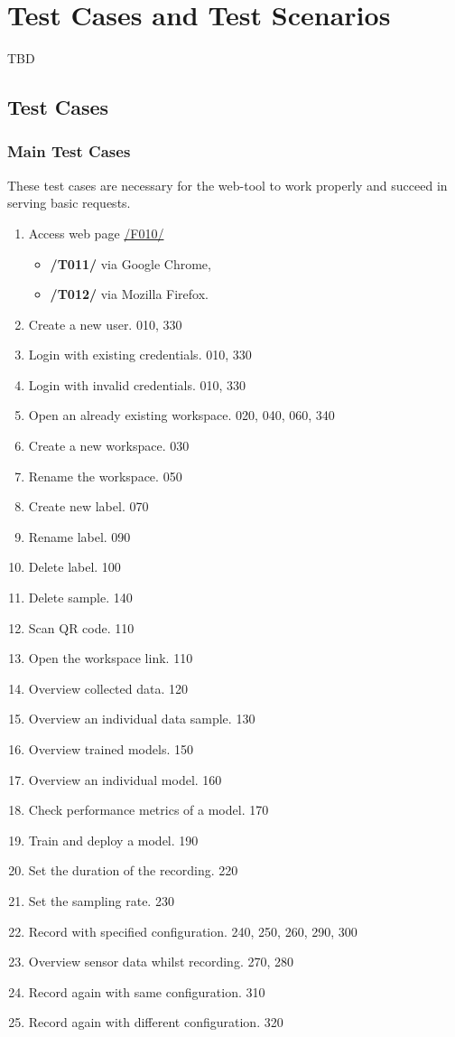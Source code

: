 \section{Test Cases and Test Scenarios}
TBD
\subsection{Test Cases}
\subsubsection{Main Test Cases}
These test cases are necessary for the web-tool to work properly and succeed in serving
basic requests.

\begin{enumerate}[{label = \textbf{/T{\protect\twodigits{\arabic{enumi}}}0/}, leftmargin = *}]
    \item Access web page \hyperref[/F010/]{/F010/}
    \begin{itemize}
        \item \textbf{/T011/} via Google Chrome,
        \item \textbf{/T012/} via Mozilla Firefox.
    \end{itemize}
    \item Create a new user. 010, 330
    \item Login with existing credentials. 010, 330
    \item Login with invalid credentials. 010, 330
    \item Open an already existing workspace. 020, 040, 060, 340
    \item Create a new workspace. 030
    \item Rename the workspace. 050
    \item Create new label. 070
    \item Rename label. 090
    \item Delete label. 100
    \item Delete sample. 140
    \item Scan QR code. 110
    \item Open the workspace link. 110
    \item Overview collected data. 120
    \item Overview an individual data sample. 130
    \item Overview trained models. 150
    \item Overview an individual model. 160
    \item Check performance metrics of a model. 170
    \item Train and deploy a model. 190
    \item Set the duration of the recording. 220
    \item Set the sampling rate. 230
    \item Record with specified configuration. 240, 250, 260, 290, 300
    \item Overview sensor data whilst recording. 270, 280
    \item Record again with same configuration. 310
    \item Record again with different configuration. 320
\end{enumerate}
